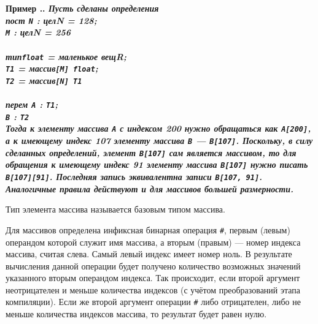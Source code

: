 \documentclass[10pt]{report}
\newcounter{exam}[section]
\renewcommand{\theexam}{\thesection.\arabic{exam}}
\newenvironment{Example}{\par\refstepcounter{exam}\bf Пример \theexam. \sl}{\rm\par}
\begin{document}
\begin{Example} \textit{Пусть сделаны определения}\\
\rm
\textbf{пост} \texttt{N} : \textbf{целN} = 128;\\
\hspace*{10mm} \texttt{M} : \textbf{целN} = 256\\
\\
\textbf{тип}\hspace*{5mm}\texttt{float} = \textbf{маленькое вещR};\\
\hspace*{12mm}\texttt{T1} = \textbf{массив}\texttt{[M] float};\\
\hspace*{12mm}\texttt{T2} = \textbf{массив}\texttt{[N] T1}\\
\\
\textbf{перем} \texttt{A} : \texttt{T1};\\
\hspace*{11mm} \texttt{B} : \texttt{T2}
\\
\textit{Тогда к элементу массива \texttt{A} с индексом 200 нужно обращаться как \texttt{A[200]}, а к имеющему индекс 107 элементу массива \texttt{B} --- \texttt{B[107]}.
Поскольку, в силу сделанных определений, элемент \texttt{B[107]} сам является массивом, то для обращения к имеющему индекс 91 элементу массива \texttt{B[107]} нужно писать
\texttt{B[107][91]}. Последняя запись эквивалентна записи \texttt{B[107, 91]}. Аналогичные правила действуют и для массивов большей размерности.}
\end{Example}

Тип элемента массива называется базовым типом массива.

Для массивов определена инфиксная бинарная операция \texttt{\#}, первым (левым) операндом которой служит имя массива, а вторым (правым) --- номер индекса массива, считая слева.
Самый левый индекс имеет номер ноль. В результате вычисления данной операции будет получено количество возможных значений указанного вторым операндом индекса. Так происходит,
если второй аргумент неотрицателен и меньше количества индексов (с учётом преобразований этапа компиляции). Если же второй аргумент операции \texttt{\#} либо отрицателен, либо
не меньше количества индексов массива, то результат будет равен нулю.
\end{document}
